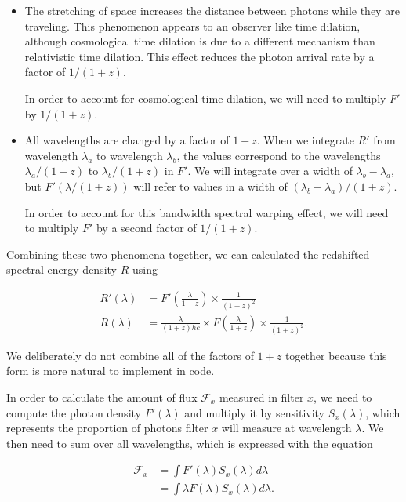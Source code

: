 \documentclass{article}
\begin{document}
\begin{itemize}
  \item The stretching of space increases the distance between photons while
  they are traveling. This phenomenon appears to an observer like time
  dilation, although cosmological time dilation is due to a different mechanism
  than relativistic time dilation. This effect reduces the photon arrival rate
  by a factor of $1/(1+z)$.

  In order to account for cosmological time dilation, we will need to multiply
  $F'$ by $1/(1+z)$.

  \item All wavelengths are changed by a factor of $1 + z$. When we integrate
  $R'$ from wavelength $\lambda_a$ to wavelength $\lambda_b$, the values
  correspond to the wavelengths $\lambda_a / (1+z)$ to $\lambda_b / (1+z)$ in
  $F'$. We will integrate over a width of $\lambda_b - \lambda_a$, but
  $F'(\lambda / (1+z))$ will refer to values in a width of
  $(\lambda_b - \lambda_a) / (1+z)$.

  In order to account for this bandwidth spectral warping effect, we will need
  to multiply $F'$ by a second factor of $1/(1+z)$.
\end{itemize}

Combining these two phenomena together, we can calculated the redshifted
spectral energy density $R$ using

\begin{equation}
\begin{aligned}
\label{eq:redshifted_density}
  R'(\lambda) &= F'\left(\frac{\lambda}{1+z}\right) \times \frac{1}{(1 + z)^2} \\
  R(\lambda) &= \frac{\lambda}{(1+z)hc} \times F\left(\frac{\lambda}{1+z}\right) \times \frac{1}{(1 + z)^2} .
\end{aligned}
\end{equation}

We deliberately do not combine all of the factors of $1+z$ together because
this form is more natural to implement in code.

In order to calculate the amount of flux $\mathcal{F}_x$ measured in filter
$x$, we need to compute the photon density $F'(\lambda)$ and multiply it by
sensitivity $S_x(\lambda)$, which represents the proportion of photons filter $x$
will measure at wavelength $\lambda$. We then need to sum over all wavelengths,
which is expressed with the equation

\begin{equation}
\begin{aligned}
\label{eq:flux_definition}
  \mathcal{F}_x &= \int F'(\lambda) S_x(\lambda) d\lambda \\
                &= \int \lambda F(\lambda) S_x(\lambda) d\lambda.
\end{aligned}
\end{equation}
\end{document}

